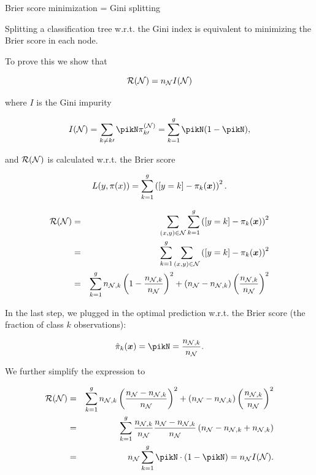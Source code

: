 \begin{vbframe}{Brier score minimization = Gini splitting}


Splitting a classification tree w.r.t. the Gini index is equivalent to minimizing the Brier score in each node. 

\lz 

To prove this we show that 


$$
  \mathcal{R}(\mathcal{N}) = n_{\mathcal{N}} I(\mathcal{N})
$$
  
  where $I$ is the Gini impurity 

$$I(\Np) = \sum_{k\neq k\prime} \pikN \pi^{(\Np)}_{k\prime} = \sum_{k=1}^g \pikN(1-\pikN),
$$



  and $\mathcal{R}(\mathcal{N})$ is calculated w.r.t. the Brier score

$$
  L(y, \pi(x)) = \sum_{k = 1}^g \left([y = k] - \pi_k(\bm{x})\right)^2.
$$

\framebreak


\begin{eqnarray*}
\mathcal{R}(\mathcal{N}) &=& \sum_{(x, y) \in \mathcal{N}}  \sum_{k = 1}^g \left([y = k] - \pi_k(\bm{x})\right)^2 \\
&=& \sum_{k = 1}^g \sum_{(x, y) \in \mathcal{N}}   \left([y = k] - \pi_k(\bm{x})\right)^2 \\
&=& \sum_{k = 1}^g n_{\mathcal{N},k}\left(1 - \frac{n_{\mathcal{N},k}}{n_{\mathcal{N} }}\right)^2 + (n_{\mathcal{N} } - n_{\mathcal{N},k})\left(\frac{n_{\mathcal{N},k}}{n_{\mathcal{N} }}\right)^2
\end{eqnarray*}


In the last step, we plugged in the optimal prediction w.r.t. the Brier score (the fraction of class $k$ observations):

$$\hat \pi_k(\xv)= \pikN = \frac{n_{\Np,k}}{n_{\Np }}.$$ 


We further simplify the expression to

\begin{eqnarray*}
\risk(\Np) &=&  \sum_{k = 1}^g n_{\Np,k}\left(\frac{n_{\Np } - n_{\Np,k}}{n_{\Np }}\right)^2 + (n_{\Np } - n_{\Np,k})\left(\frac{n_{\Np,k}}{n_{\Np }}\right)^2 \\
&=& \sum_{k = 1}^g \frac{n_{\Np,k}}{n_{\Np }} \frac{n_{\Np } - n_{\Np,k}}{n_{\Np }} \left(n_{\Np } - n_{\Np,k } + n_{\Np,k}\right) \\
&=& n_{\Np } \sum_{k = 1}^g \pikN \cdot (1 - \pikN) = n_\Np I(\Np).
\end{eqnarray*}

\end{vbframe}


\endlecture


